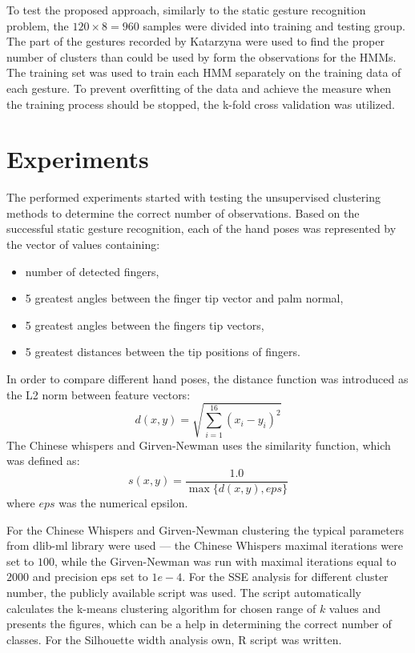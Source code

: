 To test the proposed approach, similarly to the static gesture recognition problem, the $120\times8=960$ samples were divided into training and testing group. 
The part of the gestures recorded by Katarzyna were used to find the proper number of clusters than could be used by form the observations for the HMMs. 
The training set was used to train each HMM separately on the training data of each gesture. 
To prevent overfitting of the data and achieve the measure when the training process should be stopped, the k-fold cross validation was utilized. 


\section{Experiments}



The performed experiments started with testing the unsupervised clustering methods to determine the correct number of observations.
Based on the successful static gesture recognition, each of the hand poses was represented by the vector of values containing:
\begin{itemize}
\item number of detected fingers,
\item 5 greatest angles between the finger tip vector and palm normal,
\item 5 greatest angles between the fingers tip vectors,
\item 5 greatest distances between the tip positions of fingers.
\end{itemize}
In order to compare different hand poses, the distance function was introduced as the L2 norm between feature vectors:
\begin{equation}
d(x,y) = \sqrt{ \sum_{i=1}^{16} (x_i - y_i)^2 }
\end{equation}
The Chinese whispers and Girven-Newman uses the similarity function, which was defined as: 
\begin{equation}
s(x,y) = \frac{1.0}{ \max{\{d(x,y), eps\}}}
\end{equation}
where $eps$ was the numerical epsilon.

For the Chinese Whispers and Girven-Newman clustering the typical parameters from dlib-ml library were used --- the Chinese Whispers maximal iterations were set to $100$, while the Girven-Newman was run with maximal iterations equal to $2000$ and precision eps set to $1e-4$.
For the SSE analysis for different cluster number, the publicly available script was used\cite{SSE}. 
The script automatically calculates the k-means clustering algorithm for chosen range of $k$ values and presents the figures, which can be a help in determining the correct number of classes.
For the Silhouette width analysis own, R script was written.




